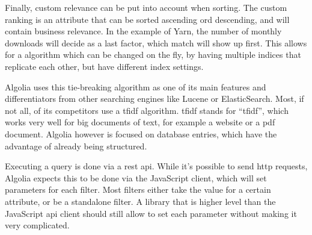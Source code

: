 Finally, custom relevance can be put into account when sorting. The custom ranking is an attribute that can be sorted ascending ord descending, and will contain business relevance. In the example of Yarn, the number of monthly downloads will decide as a last factor, which match will show up first. This allows for a algorithm which can be changed on the fly, by having multiple indices that replicate each other, but have different index settings.

Algolia uses this tie-breaking algorithm as one of its main features and differentiators from other searching engines like Lucene or ElasticSearch. Most, if not all, of its competitors use a \acrshort{tfidf} algorithm. \acrshort{tfidf} stands for ``\acrlong{tfidf}'', which works very well for big documents of text, for example a website or a pdf document. Algolia however is focused on database entries, which have the advantage of already being structured.

Executing a query is done via a \acrshort{rest} \acrshort{api}. While it's possible to send \acrshort{http} requests, Algolia expects this to be done via the JavaScript client, which will set parameters for each filter. Most filters either take the value for a certain \gls{attribute}, or be a standalone filter. A library that is higher level than the JavaScript \acrshort{api} client should still allow to set each parameter without making it very complicated.
